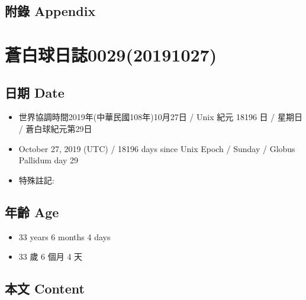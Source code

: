 \documentclass[a5paper, 12pt
]{book}
\providecommand{\tightlist}{%
  \setlength{\itemsep}{0pt}\setlength{\parskip}{0pt}}
\begin{document}
\hypertarget{ux9644ux9304-appendix-20}{%
\subsection{附錄 Appendix}\label{ux9644ux9304-appendix-20}}

\hypertarget{ux84bcux767dux7403ux65e5ux8a8c002920191027}{%
\section{蒼白球日誌0029(20191027)}\label{ux84bcux767dux7403ux65e5ux8a8c002920191027}}

\hypertarget{ux65e5ux671f-date-26}{%
\subsection{日期 Date}\label{ux65e5ux671f-date-26}}

\begin{itemize}
\tightlist
\item
  世界協調時間2019年(中華民國108年)10月27日 / Unix 紀元 18196 日 /
  星期日 / 蒼白球紀元第29日
\item
  October 27, 2019 (UTC) / 18196 days since Unix Epoch / Sunday / Globus
  Pallidum day 29
\item
  特殊註記:
\end{itemize}

\hypertarget{ux5e74ux9f61-age-26}{%
\subsection{年齡 Age}\label{ux5e74ux9f61-age-26}}

\begin{itemize}
\tightlist
\item
  33 years 6 months 4 days
\item
  33 歲 6 個月 4 天
\end{itemize}

\hypertarget{ux672cux6587-content-26}{%
\subsection{本文 Content}\label{ux672cux6587-content-26}}
\end{document}
